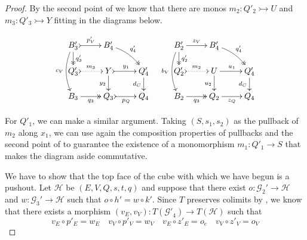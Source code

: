\documentclass[a4paper,UKenglish,cleveref,pdftex,thm-restate,numberwithinsect]{lipics-v2021}
\def\B{\textbf {\textup{B}}}
\newcommand{\commentato}[1]{ {} }
\newcommand{\mto}{\rightarrowtail}
\begin{document}
\begin{proof}
	By the second point of  we know that there are monos $m_2\colon Q'_2\mto U$ and $m_3\colon Q'_3\mto Y$  fitting in the diagrams below.
	
	\[\xymatrix@R=15pt{B'_3 \ar@{>>}[d]^{q'_3} \ar@/_.3cm/[dd]_{c_V} \ar@{>->}[r]^{p'_V}& B'_4 \ar@/^.2cm/@{>>}[dr]^{q'_4} & & B'_2 \ar[r]^{z_V} \ar@{>>}[d]^{q'_2} \ar@/_.3cm/[dd]_{b_V}& B'_4 \ar@/^.2cm/@{>>}[dr]^{q'_4}\\ Q'_3 \ar@{>.>}[r]^{m_3}& Y  \ar@{>->}[r]^{y_1} \ar[d]_{y_2}& Q'_4 \ar[d]_{d_C}& Q'_2 \ar@{>.>}[r]^{m_2} & U \ar[d]_{u_2} \ar[r]^{u_1} & Q'_4 \ar[d]_{d_C} \\ B_3 \ar@{>>}[r]_{q_3} & Q_3 \ar@{>->}[r]_{p_Q} & Q_4 &B_2 \ar@{>>}[r]_{q_3} & Q_2 \ar[r]_{z_Q} & Q_4}\]

	\noindent 
	\parbox{8.5cm}{\hspace{15pt}
	For $Q'_1$, we can make a similar argument. Taking $(S, s_1, s_2)$ as the pullback of $m_2$ along $x_1$, we can use again the composition properties of pullbacks and the second point of  to guarantee the existence of a monomorphism $m_1\colon Q'_1\to S$ that makes the diagram aside commutative.}\hfill
	\parbox{4cm}{}

We have to show that the top face of the cube with which we have begun is a pushout. Let $\mathcal{H}$ be $(E, V, Q, s, t, q)$ and suppose that there exist  $o\colon  \mathcal{G}_2' \to \mathcal{H}$ and $w\colon  \mathcal{G}_3' \to \mathcal{H}$ such that $o \circ h' = w \circ k'$. Since $T$ preserves colimits by , we know that there exists a morphism $(v_E, v_V)\colon T(\mathcal{G'}_4)\to T(\mathcal{H})$ such that
\[v_E\circ p'_E=w_E \quad v_V\circ p'_V=w_V \quad v_E\circ z'_E=o_e \quad v_V\circ z'_V=o_V\]

\commentato{\xymatrix@C=10pt@R=6pt{
		&B_1'\ar@{>>}[dd]|\hole_(.65){q_1'}\ar@{>->}[rr]^{h_V'} \ar[dl]_(.6){k_V'} && B_2' \ar@{>>}[dd]|\hole_(.65){q_2'} \ar[dl]_(.6){z_V'}\ar[dr]^{o_V}\\
		B_3'  \ar@{>>}[dd]_{q_3'}\ar@{>->}[rr]^(.7){p_V'} & & B_4' \ar@{>>}[dd]_(.3){q_4'} \ar[rr]^(.7){v_V}&&  V\ar[dd]^{q}\\
		&Q_1'\ar@{>->}[rr]|\hole^(.65){h'_Q} \ar[dl]_{k'_Q} && Q_2' \ar[dl]^(.4){z_Q'}\ar[dr]^{o_Q}\\
		Q'_3 \ar@{>->}[rr]_{p_Q'} & & Q'_4\ar@{.>}[rr]_{v_C} && Q
}}


\end{proof}
\end{document}
